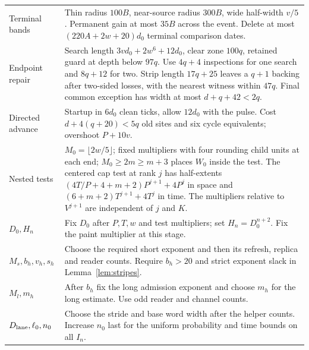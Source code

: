 \begin{longtable}{@{}>{\raggedright\arraybackslash}p{.30\linewidth}>{\raggedright\arraybackslash}p{.62\linewidth}@{}}
Terminal bands & Thin radius \(100B\), near-source radius \(300B\), wide half-width \(v/5\). Permanent gain at most \(35B\) across the event. Delete at most \((220A+2w+20)d_0\) terminal comparison dates. \\
Endpoint repair & Search length \(3v d_0+2w^6+12d_0\), clear zone \(100q\), retained guard at depth below \(97q\). Use \(4q+4\) inspections for one search and \(8q+12\) for two. Strip length \(17q+25\) leaves a \(q+1\) backing after two-sided losses, with the nearest witness within \(47q\). Final common exception has width at most \(d+q+42<2q\). \\
Directed advance & Startup in \(6d_0\) clean ticks, allow \(12d_0\) with the pulse. Cost \(d+4(q+20)<5q\) old sites and six cycle equivalents; overshoot \(P+10v\). \\
Nested tests & \(M_0=\lfloor2w/5\rfloor\); fixed multipliers with four rounding child units at each end; \(M_0\ge2m\ge m+3\) places \(W_0\) inside the test. The centered cap test at rank \(j\) has half-extents \((4T/P+4+m+2)P^{j+1}+4P^j\) in space and \((6+m+2)T^{j+1}+4T^j\) in time. The multipliers relative to \(V^{j+1}\) are independent of \(j\) and \(K\). \\
\(D_0,H_n\) & Fix \(D_0\) after \(P,T,w\) and test multipliers; set \(H_n=D_0^{n+2}\). Fix the paint multiplier at this stage. \\
\(M_s,b_h,v_h,s_h\) & Choose the required short exponent and then its refresh, replica and reader counts. Require \(b_h>20\) and strict exponent slack in Lemma~\ref{lem:stripes}. \\
\(M_l,m_h\) & After \(b_h\) fix the long admission exponent and choose \(m_h\) for the long estimate. Use odd reader and channel counts. \\
\(D_{\rm lane},\ell_0,n_0\) & Choose the stride and base word width after the helper counts. Increase \(n_0\) last for the uniform probability and time bounds on all \(I_n\). \\
\bottomrule
\end{longtable}


